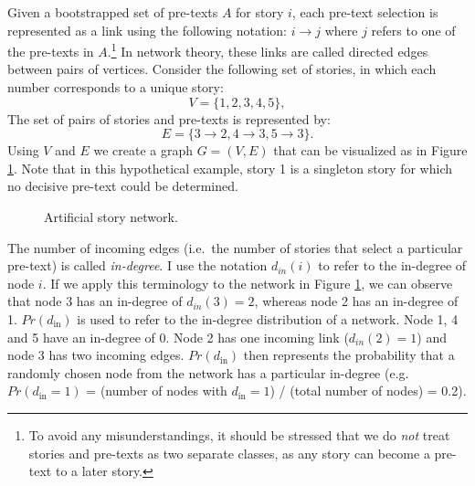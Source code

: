 Given a bootstrapped set of pre-texts $A$ for story $i$, each pre-text selection is represented as a link using the following notation: $i \rightarrow j$ where $j$ refers to one of the pre-texts in $A$.\footnote{To avoid any misunderstandings, it should be stressed that we do \emph{not} treat stories and pre-texts as two separate classes, as any story can become a pre-text to a later story.} In network theory, these links are called directed edges between pairs of vertices. Consider the following set of stories, in which each number corresponds to a unique story: 
\begin{equation}
V = \{1, 2, 3, 4, 5\},
\end{equation}
The set  of pairs of stories and pre-texts is represented by: 
\begin{equation}
E = \{3 \rightarrow 2, 4 \rightarrow 3, 5 \rightarrow 3\}.
\end{equation}
Using $V$ and $E$ we create a graph $G = (V, E)$ that can be visualized as in Figure \ref{fig:example-network}. Note that in this hypothetical example, story 1 is a singleton story for which no decisive pre-text could be determined. 

\begin{figure}
\centering
{}
\caption{Artificial story network.}
\label{fig:example-network}
\end{figure}

The number of incoming edges (i.e.\ the number of stories that select a particular pre-text) is called \emph{in-degree}. I use the notation $d_{in}(i)$ to refer to the in-degree of node $i$. If we apply this terminology to the network in Figure \ref{fig:example-network}, we can observe that node 3 has an in-degree of $d_{in}(3) = 2$, whereas node 2 has an in-degree of 1. $Pr(d_{\text{in}})$ is used to refer to the in-degree distribution of a network. Node 1, 4 and 5 have an in-degree of 0. Node 2 has one incoming link ($d_{in}(2)=1$) and node 3 has two incoming edges. $Pr(d_{\text{in}})$ then represents the probability that a randomly chosen node from the network has a particular in-degree (e.g. $Pr(d_{\text{in}}=1)$ = (number of nodes with $d_{\text{in}}=1$) / (total number of nodes) = 0.2).

